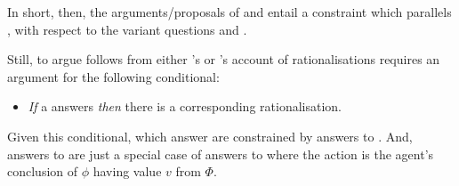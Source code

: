 \begin{note}
  In short, then, the arguments/proposals of \citeauthor{Davidson:1963aa} and \citeauthor{Hieronymi:2011aa} entail a constraint which parallels \issueInclusion{}, with respect to the variant questions \qWhyR{} and \qHowR{}.

  Still, to argue \issueInclusion{} follows from either \citeauthor{Davidson:1963aa}'s or \citeauthor{Hieronymi:2011aa}'s account of rationalisations requires an argument for the following conditional:
  \begin{itemize}
  \item
    \emph{If} a \ros{} answers \qWhy{} \emph{then} there is a corresponding rationalisation.
  \end{itemize}
  Given this conditional,  which answer \qWhy{} are constrained by answers to \qHowR{}.
  And, answers to \qHow{} are just a special case of answers to \qHowR{} where the action is the agent's conclusion of \(\phi\) having value \(v\) from \(\Phi\).
\end{note}

